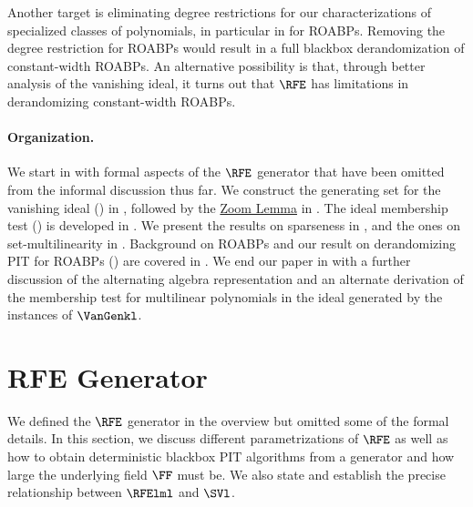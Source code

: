 \documentclass{toc}
\begin{document}
Another target is eliminating degree restrictions for our characterizations of specialized classes of polynomials, in particular in  for ROABPs.
Removing the degree restriction for ROABPs would result in a full blackbox derandomization of constant-width ROABPs. An alternative possibility is that, through better analysis of the vanishing ideal, it turns out that $\RFE$ has limitations in derandomizing constant-width ROABPs.

\paragraph{Organization.}
We start in  with formal aspects of the $\RFE$ generator that have been omitted from the informal discussion thus far. 
We construct the generating set for the vanishing ideal
() in ,
followed by the \hyperref[lem.multi-zsub-deriv]{Zoom Lemma} in .
The ideal membership test () is developed in
.
We present the results on sparseness in ,
and the ones on set-multilinearity in .
Background on ROABPs and our result on derandomizing PIT for ROABPs
() are covered in .
We end our paper in  with a further discussion
of the alternating algebra representation and an alternate derivation of the membership test for multilinear polynomials in the ideal generated by the instances of $\VanGenkl$.


\section{RFE Generator}
\label{s.rfe-formal}

We defined the $\RFE$ generator in the overview but omitted some of the formal details. In this section, we discuss different parametrizations of $\RFE$ as well as how to obtain deterministic blackbox PIT algorithms from a generator and how large the underlying field $\FF$ must be. We also state and establish the precise relationship between $\RFElml$ and $\SVl$.
\end{document}
